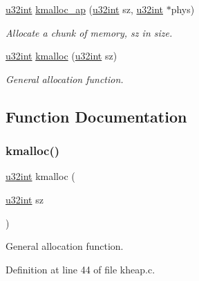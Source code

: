 \begin{DoxyCompactItemize}
\hyperlink{a00125_a7ae3a26c17ddfe117c6291739780801d_a7ae3a26c17ddfe117c6291739780801d}{u32int} \hyperlink{a00074_ab4fd209369f6c18acead48b80e7f09c7_ab4fd209369f6c18acead48b80e7f09c7}{kmalloc\+\_\+ap} (\hyperlink{a00125_a7ae3a26c17ddfe117c6291739780801d_a7ae3a26c17ddfe117c6291739780801d}{u32int} sz, \hyperlink{a00125_a7ae3a26c17ddfe117c6291739780801d_a7ae3a26c17ddfe117c6291739780801d}{u32int} $\ast$phys)
\begin{DoxyCompactList}\small\item\em Allocate a chunk of memory, sz in size. \end{DoxyCompactList}\item 
\hyperlink{a00125_a7ae3a26c17ddfe117c6291739780801d_a7ae3a26c17ddfe117c6291739780801d}{u32int} \hyperlink{a00074_a57133c6165a95f09de1806a08042e5e0_a57133c6165a95f09de1806a08042e5e0}{kmalloc} (\hyperlink{a00125_a7ae3a26c17ddfe117c6291739780801d_a7ae3a26c17ddfe117c6291739780801d}{u32int} sz)
\begin{DoxyCompactList}\small\item\em General allocation function. \end{DoxyCompactList}\end{DoxyCompactItemize}


\subsection{Function Documentation}
\mbox{\label{a00074_a57133c6165a95f09de1806a08042e5e0_a57133c6165a95f09de1806a08042e5e0}} 
\subsubsection{\texorpdfstring{kmalloc()}{kmalloc()}}
{\footnotesize\ttfamily \hyperlink{a00125_a7ae3a26c17ddfe117c6291739780801d_a7ae3a26c17ddfe117c6291739780801d}{u32int} kmalloc (\begin{DoxyParamCaption}\item[{\hyperlink{a00125_a7ae3a26c17ddfe117c6291739780801d_a7ae3a26c17ddfe117c6291739780801d}{u32int}}]{sz }\end{DoxyParamCaption})}



General allocation function. 



Definition at line 44 of file kheap.\+c.


